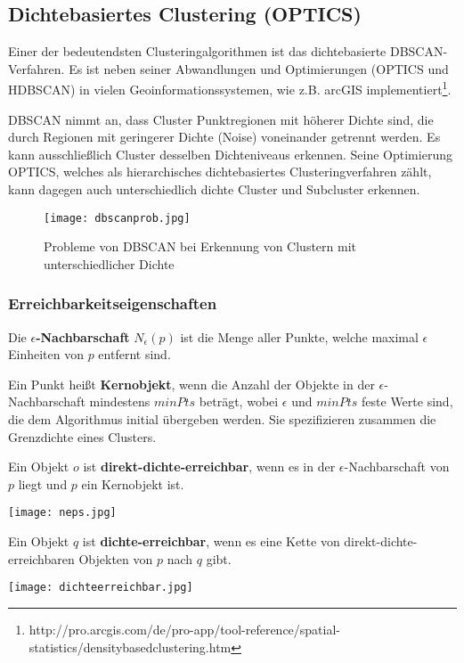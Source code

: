 \documentclass[11pt,ceqn]{book}
\begin{document}
\subsection{Dichtebasiertes Clustering (OPTICS)}
Einer der bedeutendsten Clusteringalgorithmen ist das dichtebasierte DBSCAN-Verfahren. Es ist neben seiner Abwandlungen und Optimierungen (OPTICS und HDBSCAN) in vielen Geoinformationssystemen, wie z.B. arcGIS implementiert\footnote{http://pro.arcgis.com/de/pro-app/tool-reference/spatial-statistics/densitybasedclustering.htm}. 

DBSCAN nimmt an, dass Cluster Punktregionen mit höherer Dichte sind, die durch Regionen mit geringerer Dichte (Noise) voneinander getrennt werden. Es kann ausschließlich Cluster desselben Dichteniveaus erkennen. Seine Optimierung OPTICS, welches als hierarchisches dichtebasiertes Clusteringverfahren zählt, kann dagegen auch unterschiedlich dichte Cluster und Subcluster erkennen.

\begin{figure}[H]
\centering
\texttt{[image: dbscanprob.jpg]}
\caption{Probleme von DBSCAN bei Erkennung von Clustern mit unterschiedlicher Dichte}\label{cluster}
\end{figure}

\subsubsection{Erreichbarkeitseigenschaften \cite{dbscan}}
Die \textbf{$\epsilon$-Nachbarschaft} $N_\epsilon(p)$ ist die Menge aller Punkte, welche maximal $\epsilon$ Einheiten von $p$ entfernt sind.
 
Ein Punkt heißt \textbf{Kernobjekt}, wenn die Anzahl der Objekte in der $\epsilon$-Nachbarschaft mindestens $minPts$ beträgt, wobei $\epsilon$ und $minPts$ feste Werte sind, die dem Algorithmus initial übergeben werden. Sie spezifizieren zusammen die Grenzdichte eines Clusters.

\begin{minipage}{0.6\textwidth}\raggedright
Ein Objekt $o$ ist \textbf{direkt-dichte-erreichbar}, wenn es in der $\epsilon$-Nachbarschaft von $p$ liegt und $p$ ein Kernobjekt ist.
\end{minipage}
\hfill
\begin{minipage}{0.3\textwidth}
\texttt{[image: neps.jpg]}
\end{minipage}


\begin{minipage}{0.6\textwidth}\raggedright
Ein Objekt $q$ ist \textbf{dichte-erreichbar}, wenn es eine Kette von direkt-dichte-erreichbaren Objekten von $p$ nach $q$ gibt.
\end{minipage}
\hfill
\begin{minipage}{0.3\textwidth}
\texttt{[image: dichteerreichbar.jpg]}
\end{minipage}
\end{document}
